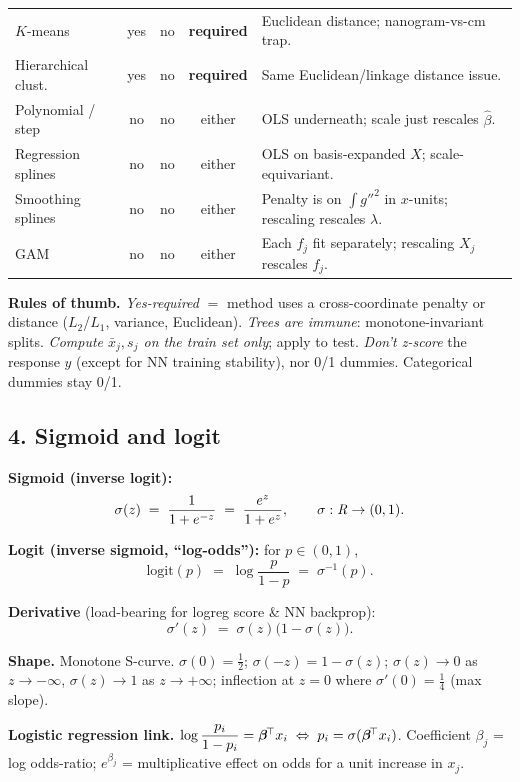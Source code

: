 \begin{tabularx}{\linewidth}{@{}l c c c X@{}}
$K$-means             & yes & no  & \textbf{required} & Euclidean distance; nanogram-vs-cm trap. \\
Hierarchical clust.   & yes & no  & \textbf{required} & Same Euclidean/linkage distance issue. \\
Polynomial / step     & no  & no  & either & OLS underneath; scale just rescales $\hat\beta$. \\
Regression splines    & no  & no  & either & OLS on basis-expanded $X$; scale-equivariant. \\
Smoothing splines     & no  & no  & either & Penalty is on $\int g''^2$ in $x$-units; rescaling rescales $\lambda$. \\
GAM                   & no  & no  & either & Each $f_j$ fit separately; rescaling $X_j$ rescales $f_j$. \\
\bottomrule
\end{tabularx}

\footnotesize

\textbf{Rules of thumb.}\quad
\emph{Yes-required} $=$ method uses a cross-coordinate penalty or distance ($L_2$/$L_1$, variance, Euclidean).
\emph{Trees are immune}: monotone-invariant splits.
\emph{Compute $\bar x_j, s_j$ on the train set only}; apply to test.
\emph{Don't z-score} the response $y$ (except for NN training stability), nor 0/1 dummies.
Categorical dummies stay 0/1.


\subsection*{4. Sigmoid and logit}

\textbf{Sigmoid (inverse logit):}
$$\sigma(z) \;=\; \frac{1}{1+e^{-z}} \;=\; \frac{e^{z}}{1+e^{z}}, \qquad \sigma:\mathit{R}\to(0,1).$$

\textbf{Logit (inverse sigmoid, ``log-odds''):} for $p\in(0,1)$,
$$\mathrm{logit}(p) \;=\; \log\!\frac{p}{1-p} \;=\; \sigma^{-1}(p).$$

\textbf{Derivative} (load-bearing for logreg score \& NN backprop):
$$\sigma'(z) \;=\; \sigma(z)\bigl(1-\sigma(z)\bigr).$$

\textbf{Shape.} Monotone S-curve. $\sigma(0)=\tfrac12$; $\sigma(-z)=1-\sigma(z)$;
$\sigma(z)\to 0$ as $z\to-\infty$, $\sigma(z)\to 1$ as $z\to+\infty$;
inflection at $z{=}0$ where $\sigma'(0)=\tfrac14$ (max slope).

\textbf{Logistic regression link.} $\log\dfrac{p_i}{1-p_i}=\bm{\beta}^{\!\top} x_i \;\Leftrightarrow\; p_i=\sigma(\bm{\beta}^{\!\top} x_i)$. Coefficient $\beta_j$ = log odds-ratio; $e^{\beta_j}$ = multiplicative effect on odds for a unit increase in $x_j$.
